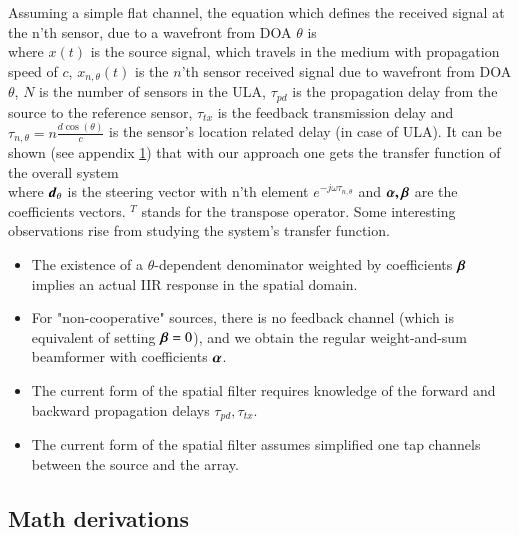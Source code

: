 \documentclass[a4paper,12pt,oneside]{report}
\begin{document}
Assuming a simple flat channel, the equation which defines the received signal at the n'th sensor, due to a wavefront from DOA $\theta$ is 
\begin{equation}

\label{eqn:SingleSensorTemporalEquality}
\end{equation}
where $ x(t) $ is the source signal, which travels in the medium with propagation speed of $ c $, $ x_{n,\theta}(t) $ is the $ n $'th sensor received signal due to wavefront from DOA $ \theta $, $ N $ is the number of sensors in the ULA, $ \tau_{pd}$ is the propagation delay from the source to the reference sensor, $ \tau_{tx} $ is the feedback transmission delay and $ \tau_{n,\theta}=n\frac{d\cos(\theta)}{c} $ is the sensor's location related delay (in case of ULA). 
It can be shown (see appendix \ref{apdx:MathDerv}) that with our approach one gets the transfer function of the overall system
$$

$$
where $\vecnot{d}_{\theta}$ is the steering vector with n'th element $e^{-j\omega \tau_{n,\theta}}$ and $\vecnot{\alpha,\beta}$ are the coefficients vectors.
$^{T}$ stands for the transpose operator.
Some interesting observations rise from studying the system's transfer function.
\begin{itemize}
\item
{
The existence of a $ \theta $-dependent denominator weighted by coefficients $\vecnot{\beta}$ implies an actual IIR response in the spatial domain.
}
\item
{
For "non-cooperative" sources, there is no feedback channel (which is equivalent of setting $\vecnot{\beta} = 0 $), and we obtain the regular weight-and-sum beamformer with coefficients $\vecnot{\alpha}$.
}
\item 
{
The current form of the spatial filter requires knowledge of the forward and backward propagation delays $\tau_{pd},\tau_{tx}$.
}
\item 
{
The current form of the spatial filter assumes simplified one tap channels between the source and the array.
}
\end{itemize}



\begin{appendices}
\chapter{Math derivations}

\label{apdx:MathDerv}
\end{appendices}
\end{document}
